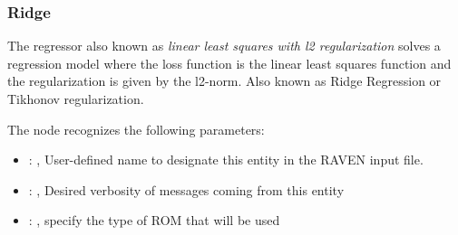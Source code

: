 \subsubsection{Ridge}
  The  regressor also known as                              \textit{linear least
  squares with l2 regularization} solves a regression                              model where the
  loss function is the linear least squares function and the
  regularization is given by the l2-norm.                              Also known as Ridge
  Regression or Tikhonov regularization.

  The  node recognizes the following parameters:
    \begin{itemize}
      \item {}: , 
        User-defined name to designate this entity in the RAVEN input file.
      \item {}: , 
        Desired verbosity of messages coming from this entity
      \item {}: , 
        specify the type of ROM that will be used
  \end{itemize}

